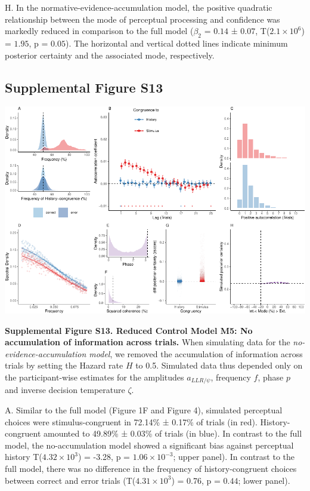 \documentclass[
]{article}
\begin{document}
H. In the normative-evidence-accumulation model, the positive quadratic
relationship between the mode of perceptual processing and confidence
was markedly reduced in comparison to the full model (\(\beta_2\) =
\(0.14\) ± \(0.07\), T(\(\ensuremath{2.1\times 10^{6}}\)) = \(1.95\), p
= \(0.05\)). The horizontal and vertical dotted lines indicate minimum
posterior certainty and the associated mode, respectively.

\newpage

\hypertarget{supplemental-figure-s13}{%
\subsection{Supplemental Figure S13}\label{supplemental-figure-s13}}

\includegraphics{modes_mouse_rev1b_files/figure-latex/Supplemental_Figure_13-1.pdf}

\textbf{Supplemental Figure S13. Reduced Control Model M5: No
accumulation of information across trials.} When simulating data for the
\emph{no-evidence-accumulation model}, we removed the accumulation of
information across trials by setting the Hazard rate \(H\) to 0.5.
Simulated data thus depended only on the participant-wise estimates for
the amplitudes \(a_{LLR/\psi}\), frequency \(f\), phase \(p\) and
inverse decision temperature \(\zeta\).

A. Similar to the full model (Figure 1F and Figure 4), simulated
perceptual choices were stimulus-congruent in 72.14\% ± 0.17\% of trials
(in red). History-congruent amounted to 49.89\% ± 0.03\% of trials (in
blue). In contrast to the full model, the no-accumulation model showed a
significant bias against perceptual history
T(\ensuremath{4.32\times 10^{3}}) = -3.28, p =
\(\ensuremath{1.06\times 10^{-3}}\); upper panel). In contrast to the
full model, there was no difference in the frequency of
history-congruent choices between correct and error trials
(T(\ensuremath{4.31\times 10^{3}}) = 0.76, p = \(0.44\); lower panel).
\end{document}
